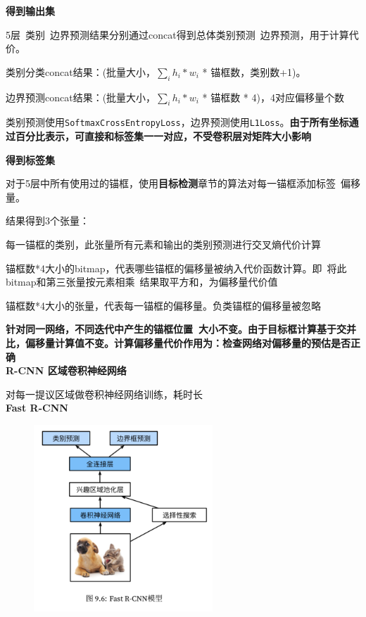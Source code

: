\documentclass[UTF8]{ctexart}
\begin{document}
  \quad \textbf{得到输出集}

  \quad \quad 5层\ 类别\ 边界预测结果分别通过concat得到总体类别预测\ 边界预测，用于计算代价。

  \quad \quad \quad 类别分类concat结果：(批量大小，$\sum_i h_i * w_i$ * 锚框数，类别数+1)。

  \quad \quad \quad 边界预测concat结果：(批量大小，$\sum_i h_i * w_i$ * 锚框数 * 4)，4对应偏移量个数
  
  \quad \quad 类别预测使用\texttt{SoftmaxCrossEntropyLoss}，边界预测使用\texttt{L1Loss}。\textbf{由于所有坐标通过百分比表示，可直接和标签集一一对应，不受卷积层对矩阵大小影响}

  \quad \textbf{得到标签集}

  \quad \quad 对于5层中所有使用过的锚框，使用\textbf{目标检测}章节的算法对每一锚框添加标签\ 偏移量。
  
  \quad \quad 结果得到3个张量：
  
  \quad \quad \quad 每一锚框的类别，此张量所有元素和输出的类别预测进行交叉熵代价计算
  
  \quad \quad \quad 锚框数*4大小的bitmap，代表哪些锚框的偏移量被纳入代价函数计算。即\ 将此bitmap和第三张量按元素相乘\ 结果取平方和，为偏移量代价值
  
  \quad \quad \quad 锚框数*4大小的张量，代表每一锚框的偏移量。负类锚框的偏移量被忽略
  
  \quad \quad \quad \textbf{针对同一网络，不同迭代中产生的锚框位置\ 大小不变。由于目标框计算基于交并比，偏移量计算值不变。计算偏移量代价作用为：检查网络对偏移量的预估是否正确}\\
\textbf{R-CNN 区域卷积神经网络}

  对每一提议区域做卷积神经网络训练，耗时长\\
\textbf{Fast R-CNN}

  \begin{figure}[H] %
    \centering %
    \includegraphics[width=0.6\textwidth]{note_images/Fast_R-CNN.png} %
  \end{figure}
\end{document}
